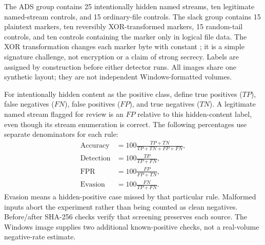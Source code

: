 The ADS group contains 25 intentionally hidden named streams, ten legitimate
named-stream controls, and 15 ordinary-file controls. The slack group contains
15 plaintext markers, ten reversibly XOR-transformed markers, 15 random-tail
controls, and ten controls containing the marker only in logical file data.
The XOR transformation changes each marker byte with constant ;
it is a simple signature challenge, not encryption or a claim of strong secrecy.
Labels are assigned by construction before either detector runs. All images
share one synthetic layout; they are not independent Windows-formatted volumes.

For intentionally hidden content as the positive class, define true positives
($TP$), false negatives ($FN$), false positives ($FP$), and true negatives
($TN$). A legitimate named stream flagged for review is an $FP$ relative to
this hidden-content label, even though its stream enumeration is correct.
The following percentages use separate denominators for each rule:
\begin{align}
\mathrm{Accuracy} &= 100\frac{TP+TN}{TP+TN+FP+FN},\\
\mathrm{Detection} &= 100\frac{TP}{TP+FN},\\
\mathrm{FPR} &= 100\frac{FP}{FP+TN},\\
\mathrm{Evasion} &= 100\frac{FN}{TP+FN}.
\end{align}
Evasion means a hidden-positive case missed by that particular rule.
Malformed inputs abort the experiment rather than being counted as clean
negatives. Before/after SHA-256 checks verify that screening preserves each
source. The Windows image supplies two additional known-positive checks,
not a real-volume negative-rate estimate.
